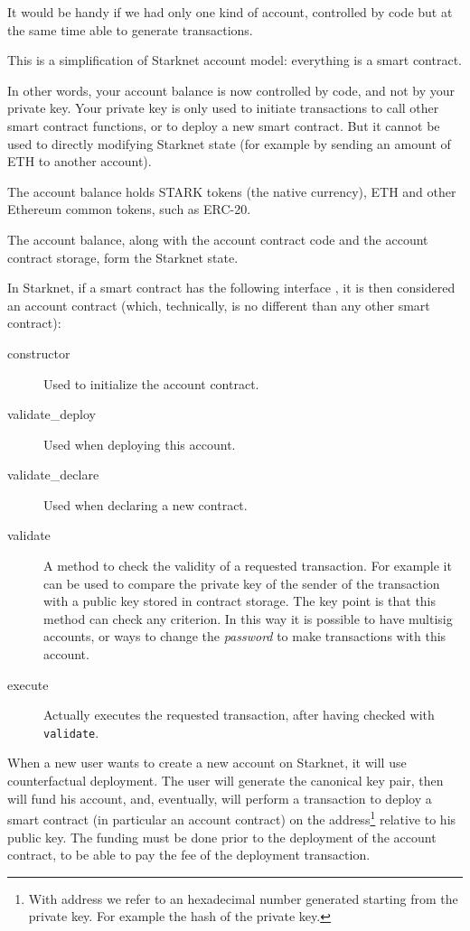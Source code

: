 \documentclass[12pt]{article}
\begin{document}
It would be handy if we had only one kind of account, controlled by code but at the same time able to generate transactions.

This is a simplification of Starknet account model: everything is a smart contract.

In other words, your account balance is now controlled by code, and not by your private key. Your private key is only used to initiate transactions to call other smart contract functions, or to deploy a new smart contract. But it cannot be used to directly modifying Starknet state (for example by sending an amount of ETH to another account).

The account balance holds STARK tokens (the native currency), ETH and other Ethereum common tokens, such as ERC-20.

The account balance, along with the account contract code and the account contract storage, form the Starknet state.

In Starknet, if a smart contract has the following interface \cite{starknet_account_abstraction}, it is then considered an account contract (which, technically, is no different than any other smart contract):
\begin{description}
    \item[constructor] Used to initialize the account contract.
    \item[validate\_deploy] Used when deploying this account.
    \item[validate\_declare] Used when declaring a new contract.
    \item[validate] A method to check the validity of a requested transaction. For example it can be used to compare the private key of the sender of the transaction with a public key stored in contract storage. The key point is that this method can check any criterion. In this way it is possible to have multisig accounts, or ways to change the \emph{password} to make transactions with this account. 
    \item[execute] Actually executes the requested transaction, after having checked with \verb|validate|.  
\end{description}

When a new user wants to create a new account on Starknet, it will use counterfactual deployment. The user will generate the canonical key pair, then will fund his account, and, eventually, will perform a transaction to deploy a smart contract (in particular an account contract) on the address\footnote{With address we refer to an hexadecimal number generated starting from the private key. For example the hash of the private key.} relative to his public key. The funding must be done prior to the deployment of the account contract, to be able to pay the fee of the deployment transaction.
\end{document}
